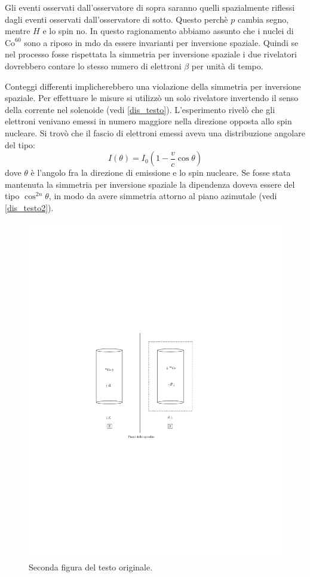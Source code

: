 Gli eventi osservati dall'osservatore di sopra saranno quelli spazialmente
riflessi dagli eventi osservati dall'osservatore di sotto. Questo perchè $p$ 
cambia segno,
mentre $H$ e lo spin no. In questo ragionamento abbiamo assunto che i nuclei di 
$\text{Co}^{60}$ sono a riposo in mdo da essere invarianti per inversione 
spaziale.
Quindi se nel processo fosse rispettata la simmetria per inversione spaziale i 
due rivelatori dovrebbero contare lo stesso numero di elettroni $\beta$ per 
unità di tempo.

Conteggi differenti implicherebbero una violazione della simmetria per 
inversione spaziale. Per effettuare le misure si utilizzò un solo rivelatore 
invertendo il senso della
corrente nel solenoide (vedi \autoref{dis_testo}). L'esperimento rivelò che 
gli elettroni venivano emessi in numero maggiore nella direzione opposta allo 
spin nucleare.
Si trovò che il fascio di elettroni emessi aveva una distribuzione angolare 
del tipo:
\[
I(\theta)=I_0(1-\frac{v}{c}\cos\theta)
\]
dove $\theta$ è l'angolo fra la direzione di emissione e lo spin nucleare.
Se fosse stata mantenuta la simmetria per inversione spaziale la dipendenza 
doveva essere del tipo $\cos^{2n}\theta$, in modo da avere simmetria attorno al 
piano azimutale
(vedi \autoref{dis_testo2}).
\begin{figure}[!hbt]
\centering
\caption{Seconda figura del testo originale.}
\label{dis_testo2}
\includegraphics{img/dis_pboh2}
\end{figure}
